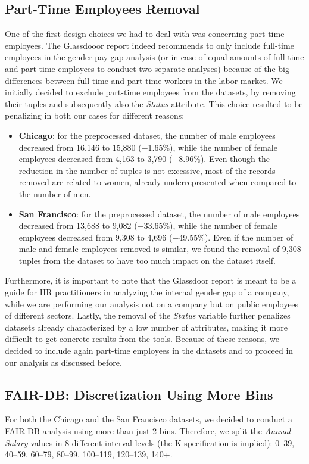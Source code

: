 \subsection{Part-Time Employees Removal}
\label{section:part-time_employees_removal}
One of the first design choices we had to deal with was concerning part-time employees. The Glassdooor report \cite{chamberlain2017analyze} indeed recommends to only include full-time employees in the gender pay gap analysis (or in case of equal amounts of full-time and part-time employees to conduct two separate analyses) because of the big differences between full-time and part-time workers in the labor market. We initially decided to exclude part-time employees from the datasets, by removing their tuples and subsequently also the \textit{Status} attribute. This choice resulted to be penalizing in both our cases for different reasons:
\begin{itemize}
\item \textbf{Chicago}: for the preprocessed dataset, the number of male employees decreased from 16,146 to 15,880 (\(-\)1.65\%), while the number of female employees decreased from 4,163 to 3,790 (\(-\)8.96\%). Even though the reduction in the number of tuples is not excessive, most of the records removed are related to women, already underrepresented when compared to the number of men.
\item \textbf{San Francisco}: for the preprocessed dataset, the number of male employees decreased from 13,688 to 9,082 (\(-\)33.65\%), while the number of female employees decreased from 9,308 to 4,696 (\(-\)49.55\%). Even if the number of male and female employees removed is similar, we found the removal of 9,308 tuples from the dataset to have too much impact on the dataset itself.
\end{itemize}
Furthermore, it is important to note that the Glassdoor report is meant to be a guide for HR practitioners in analyzing the internal gender gap of a company, while we are performing our analysis not on a company but on public employees of different sectors. Lastly, the removal of the \textit{Status} variable further penalizes datasets already characterized by a low number of attributes, making it more difficult to get concrete results from the tools. Because of these reasons, we decided to include again part-time employees in the datasets and to proceed in our analysis as discussed before.


\subsection{FAIR-DB: Discretization Using More Bins}
\label{section:fair-db_discretization_8_bins}
For both the Chicago and the San Francisco datasets, we decided to conduct a FAIR-DB analysis using more than just 2 bins. Therefore, we split the \textit{Annual Salary} values in 8 different interval levels (the K specification is implied): 0--39, 40--59, 60--79, 80--99, 100--119, 120--139, 140+.

